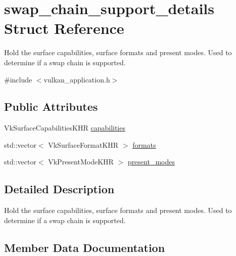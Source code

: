 \hypertarget{structswap__chain__support__details}{}\section{swap\+\_\+chain\+\_\+support\+\_\+details Struct Reference}
\label{structswap__chain__support__details}


Hold the surface capabilities, surface formats and present modes. Used to determine if a swap chain is supported.  




{\ttfamily \#include $<$vulkan\+\_\+application.\+h$>$}

\subsection*{Public Attributes}
\begin{DoxyCompactItemize}
\item 
Vk\+Surface\+Capabilities\+K\+HR \mbox{\hyperlink{structswap__chain__support__details_ad19250aaf600ea69129fdae937c0edf9}{capabilities}}
\item 
std\+::vector$<$ Vk\+Surface\+Format\+K\+HR $>$ \mbox{\hyperlink{structswap__chain__support__details_a7009f574ac663c1a6fbc6a563798f81d}{formats}}
\item 
std\+::vector$<$ Vk\+Present\+Mode\+K\+HR $>$ \mbox{\hyperlink{structswap__chain__support__details_ac76e296ce9fc91e091adb661608c9ad5}{present\+\_\+modes}}
\end{DoxyCompactItemize}


\subsection{Detailed Description}
Hold the surface capabilities, surface formats and present modes. Used to determine if a swap chain is supported. 

\subsection{Member Data Documentation}
\mbox{\label{structswap__chain__support__details_ad19250aaf600ea69129fdae937c0edf9}} 
